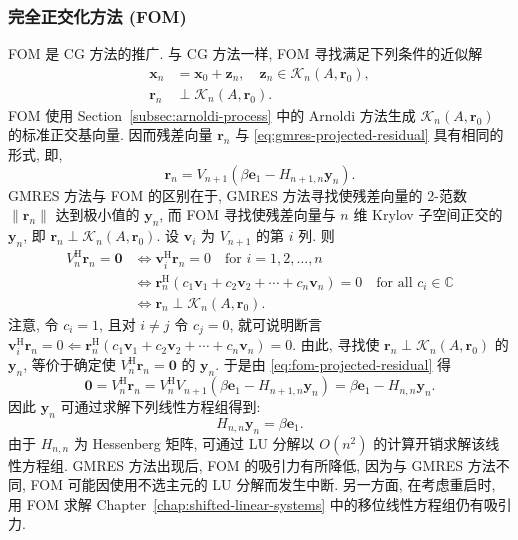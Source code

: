 \subsubsection{{完全正交化方法 (FOM)}}\label{subsec:fom}
{FOM  是 CG 方法的推广. 与 CG 方法一样, FOM 寻找满足下列条件的近似解}
\[\begin{aligned}\bm x_n&=\bm x_0+\bm z_n,\quad\bm z_n\in\mathcal K_n(A,\bm r_0),\\\bm r_n&\perp\mathcal K_n(A,\bm r_0).\end{aligned}\]
{FOM 使用 Section\ \ref{subsec:arnoldi-process} 中的 Arnoldi 方法生成 $\mathcal K_n(A,\bm r_0)$ 的标准正交基向量. 因而残差向量 $\bm r_n$ 与 \eqref{eq:gmres-projected-residual} 具有相同的形式, 即,}
\begin{equation}\label{eq:fom-projected-residual}\bm r_n=V_{n+1}(\beta\bm e_1-H_{n+1,n}\bm y_n).\end{equation}
{GMRES 方法与 FOM 的区别在于, GMRES 方法寻找使残差向量的 2-范数 $\|\bm r_n\|$ 达到极小值的 $\bm y_n$, 而 FOM 寻找使残差向量与 $n$ 维 Krylov 子空间正交的 $\bm y_n$, 即 $\bm r_n\perp\mathcal K_n(A,\bm r_0)$. 设 $\bm v_i$ 为 $V_{n+1}$ 的第 $i$ 列. 则}
\[\begin{aligned}V_n^{\mathrm H}\bm r_n=\bm0&\Leftrightarrow\bm v_i^{\mathrm H}\bm r_n=0\quad\text{for }i=1,2,\ldots,n\\&\Leftrightarrow\bm r_n^{\mathrm H}(c_1\bm v_1+c_2\bm v_2+\cdots+c_n\bm v_n)=0\quad\text{for all }c_i\in\mathbb C\\&\Leftrightarrow\bm r_n\perp\mathcal K_n(A,\bm r_0).\end{aligned}\]
{注意, 令 $c_i=1$, 且对 $i\ne j$ 令 $c_j=0$, 就可说明断言 $\bm v_i^{\mathrm H}\bm r_n=0\Leftarrow\bm r_n^{\mathrm H}(c_1\bm v_1+c_2\bm v_2+\cdots+c_n\bm v_n)=0$. 由此, 寻找使 $\bm r_n\perp\mathcal K_n(A,\bm r_0)$ 的 $\bm y_n$, 等价于确定使 $V_n^{\mathrm H}\bm r_n=\bm0$ 的 $\bm y_n$. 于是由 \eqref{eq:fom-projected-residual} 得}
\[\bm0=V_n^{\mathrm H}\bm r_n=V_n^{\mathrm H}V_{n+1}(\beta\bm e_1-H_{n+1,n}\bm y_n)=\beta\bm e_1-H_{n,n}\bm y_n.\]
{因此 $\bm y_n$ 可通过求解下列线性方程组得到:}
\[H_{n,n}\bm y_n=\beta\bm e_1.\]
{由于 $H_{n,n}$ 为 Hessenberg 矩阵, 可通过 LU 分解以 $O(n^2)$ 的计算开销求解该线性方程组. GMRES 方法出现后, FOM 的吸引力有所降低, 因为与 GMRES 方法不同, FOM 可能因使用不选主元的 LU 分解而发生中断. 另一方面, 在考虑重启时, 用 FOM 求解 Chapter\ \ref{chap:shifted-linear-systems} 中的移位线性方程组仍有吸引力.}
